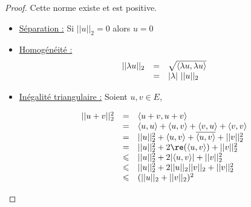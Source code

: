 \begin{proof}
    Cette norme existe et est positive. 

    \begin{itemize}
        \item \uline{Séparation :} Si $||u||_2 = 0$ alors $u=0$

        \item \uline{Homogénéité :}
        \[
            \begin{array}{rcl}
                || \lambda u ||_2 & = & \sqrt{\langle\lambda u, \lambda u \rangle} \\
                \space & = & |\lambda| ~ ||u||_2
            \end{array}
        \]

        \item \uline{Inégalité triangulaire :} Soient $u, v \in E$,

        \[
        \begin{array}{rcl}
            ||u + v||^2_2 & = & \langle u + v, u + v \rangle  \\
            \space & = & \langle u, u \rangle + \langle u, v \rangle + \langle v, u \rangle + \langle v, v \rangle \\
            \space & = & ||u||_2^2 + \langle u, v \rangle + \overline{\langle u, v \rangle} + ||v||_2^2  \\
            \space & =& ||u||_2^2 + 2 \re(\langle u, v \rangle) + ||v||_2^2 \\
            \space & \leqslant & ||u||_2^2 + 2 |\langle u, v \rangle| + ||v||_2^2 \\
            \space & \leqslant & ||u||_2^2 + 2 ||u||_2 ||v||_2 + ||v||_2^2 \\
            \space & \leqslant & (||u||_2 + ||v||_2)^2 \\
        \end{array}
        \]
    \end{itemize}
\end{proof}

